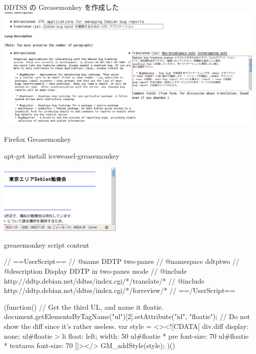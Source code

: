 \begin{frame}{DDTSS の Greasemonkey を作成した}
 \includegraphics[width=1.2\hsize]{image200906/ddtss-greasemonkey.png}
\end{frame}

\begin{frame}[containsverbatim]{Firefox Greasemonkey}
\begin{commandline}
 apt-get install iceweasel-greasemonkey
\end{commandline}
\includegraphics[width=6cm]{image200906/greasemonkey.png}
\end{frame}

\begin{frame}[containsverbatim]{greasemonkey script content}

\begin{commandline}
// ==UserScript==
// @name           DDTP two-panes
// @namespace      ddtptwo
// @description    Display DDTP in two-panes mode
// @include        http://ddtp.debian.net/ddtss/index.cgi/*/translate/*
// @include        http://ddtp.debian.net/ddtss/index.cgi/*/forreview/*
// ==/UserScript==

(function() {
    // Get the third UL, and name it floatie.
    document.getElementsByTagName("ul")[2].setAttribute("id", "floatie");
    // Do not show the diff since it's rather useless.
    var style =
	<><![CDATA[
		   div.diff {
		       display: none;
		   }
		   ul#floatie > li {
		       float: left;
		       width: 50%
		   }
		   ul#floatie * pre {
		       font-size: 70%
		   }
		   ul#floatie * textarea {
		       font-size: 70%
		   }
		   ]]></>
    GM_addStyle(style);
})()
\end{commandline}

\end{frame}

